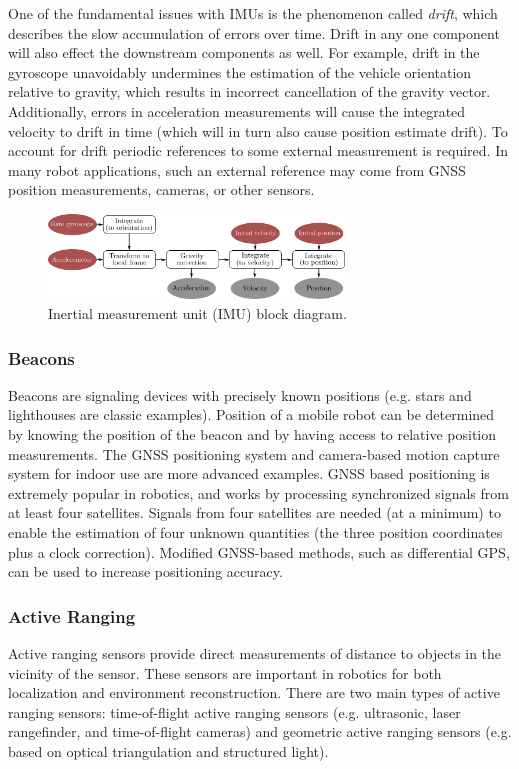 One of the fundamental issues with IMUs is the phenomenon called \textit{drift}, which describes the slow accumulation of errors over time. Drift in any one component will also effect the downstream components as well. For example, drift in the gyroscope unavoidably undermines the estimation of the vehicle orientation relative to gravity, which results in incorrect cancellation of the gravity vector. Additionally, errors in acceleration measurements will cause the integrated velocity to drift in time (which will in turn also cause position estimate drift). To account for drift periodic references to some external measurement is required. In many robot applications, such an external reference may come from GNSS position measurements, cameras, or other sensors.

\begin{figure}[ht]
    \centering
        \includegraphics[width=0.7\textwidth]{tex/figs/ch08_figs/imu.png}
      \caption{Inertial measurement unit (IMU) block diagram.}
    \label{fig:IMU}
\end{figure}

\subsubsection{Beacons}
Beacons are signaling devices with precisely known positions (e.g. stars and lighthouses are classic examples). Position of a mobile robot can be determined by knowing the position of the beacon and by having access to relative position measurements. The GNSS positioning system and camera-based motion capture system for indoor use are more advanced examples. GNSS based positioning is extremely popular in robotics, and works by processing synchronized signals from at least four satellites. Signals from four satellites are needed (at a minimum) to enable the estimation of four unknown quantities (the three position coordinates plus a clock correction). Modified GNSS-based methods, such as differential GPS, can be used to increase positioning accuracy.

\subsubsection{Active Ranging}
Active ranging sensors provide direct measurements of distance to objects in the vicinity of the sensor. These sensors are important in robotics for both localization and environment reconstruction. There are two main types of active ranging sensors: time-of-flight active ranging sensors (e.g. ultrasonic, laser rangefinder, and time-of-flight cameras) and geometric active ranging sensors (e.g. based on optical triangulation and structured light).

